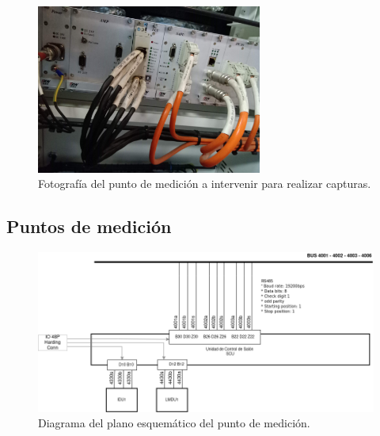 \documentclass[
11pt, %
]{charter}
\begin{document}
\begin{figure}[htpb]
\centering 
\includegraphics[width=0.66\textwidth]{./Pics/IMG_20210322_122403.jpg}
\caption{Fotografía del punto de medición a intervenir para realizar capturas.}
\label{fig:NOsniffingPhoto}
\end{figure}

\pagebreak
\subsection{Puntos de medición}
\begin{figure}[htpb]
\centering 
\includegraphics[width=1\textwidth]{./Pics/RedPIDS.drawio.png}
\caption{Diagrama del plano esquemático del punto de medición.}
\label{fig:test point SCU-PIDS diagram}
\end{figure}
\end{document}
